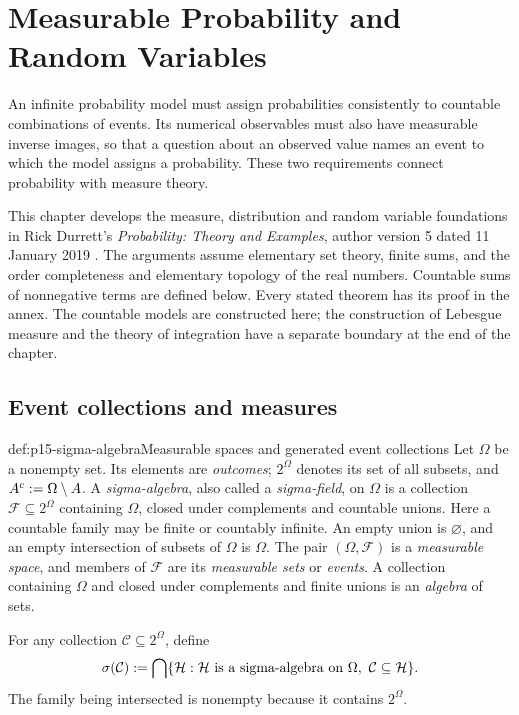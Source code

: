 \chapter{Measurable Probability and Random Variables}
\label{sec:p15-measurable-probability}

An infinite probability model must assign probabilities consistently to
countable combinations of events. Its numerical observables must also have
measurable inverse images, so that a question about an observed value names
an event to which the model assigns a probability. These two requirements
connect probability with measure theory.

This chapter develops the measure, distribution and random variable
foundations in Rick Durrett's \emph{Probability: Theory and Examples},
author version 5 dated 11 January 2019
\cite[secs.~1.1--1.3; app.~A.1]{DurrettPTEAuthor2019}.
The arguments assume elementary set theory, finite sums, and the order
completeness and elementary topology of the real numbers. Countable sums
of nonnegative terms are defined below. Every stated theorem has its proof
in the annex. The countable models are constructed here; the construction
of Lebesgue measure and the theory of integration have a separate boundary
at the end of the chapter.

\section{Event collections and measures}
\label{sec:p15-event-measures}

\begin{hbdefinition}{def:p15-sigma-algebra}{Measurable spaces and generated event collections}
Let \(\Omega\) be a nonempty set. Its elements are \emph{outcomes};
\(2^\Omega\) denotes its set of all subsets, and
\(A^c\mathrel{:=}\Omega\setminus A\). A \emph{sigma-algebra}, also called
a \emph{sigma-field}, on \(\Omega\) is a collection
\(\mathcal F\subseteq2^\Omega\) containing \(\Omega\), closed under
complements and countable unions. Here a countable family may be finite
or countably infinite. An empty union is \(\varnothing\), and an empty
intersection of subsets of \(\Omega\) is \(\Omega\).
The pair \((\Omega,\mathcal F)\) is a \emph{measurable space}, and
members of \(\mathcal F\) are its \emph{measurable sets} or
\emph{events}. A collection containing \(\Omega\) and closed under
complements and finite unions is an \emph{algebra} of sets.

For any collection \(\mathcal C\subseteq2^\Omega\), define
\[
 \sigma(\mathcal C)\mathrel{:=}
 \bigcap\{\mathcal H:\mathcal H\text{ is a sigma-algebra on }\Omega,
                              \ \mathcal C\subseteq\mathcal H\}.
\]
The family being intersected is nonempty because it contains \(2^\Omega\).
\end{hbdefinition}

